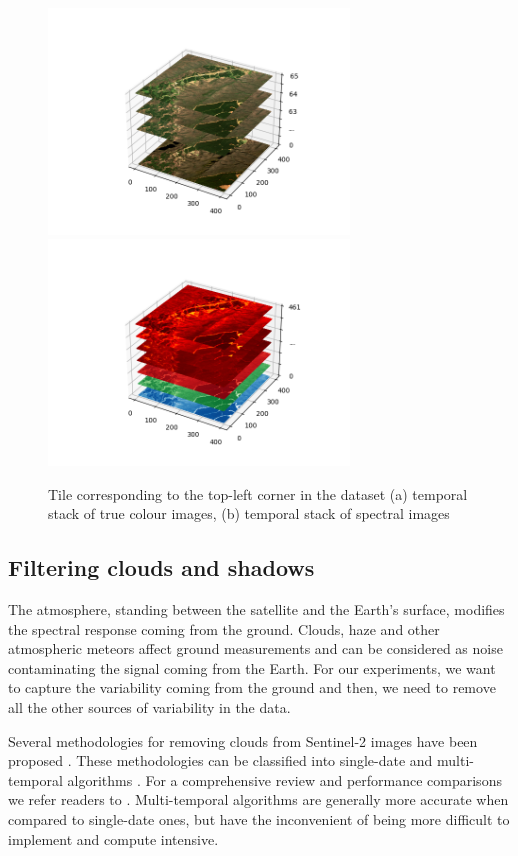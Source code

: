 \documentclass[essd, manuscript]{copernicus}
\begin{document}
\begin{figure}%
    {{\includegraphics[width=8cm]{fig2a.png} }}%
    {{\includegraphics[width=8cm]{fig2b.png} }}%
    \caption{Tile corresponding to the top-left corner in the dataset (a) temporal stack of true colour images, (b) temporal stack of spectral images}%
    \label{dataset_detail}%
\end{figure}

\subsection{Filtering clouds and shadows}
The atmosphere, standing between the satellite and the Earth's surface, modifies the spectral response coming from the ground. Clouds, haze and other atmospheric meteors affect ground measurements and can be considered as noise contaminating the signal coming from the Earth. For our experiments, we want to capture the variability coming from the ground and then, we need to remove all the other sources of variability in the data.

Several methodologies for removing clouds from Sentinel-2 images have been proposed \citep{louis2016sentinel,hagolle2017maja,qiu2019fmask}. These methodologies can be classified into single-date and multi-temporal algorithms \citep{}. For a comprehensive review and performance comparisons we refer readers to \citep{zhu2018cloud}. Multi-temporal algorithms are generally more accurate when compared to single-date ones, but have the inconvenient of being more difficult to implement and compute intensive.
\end{document}

